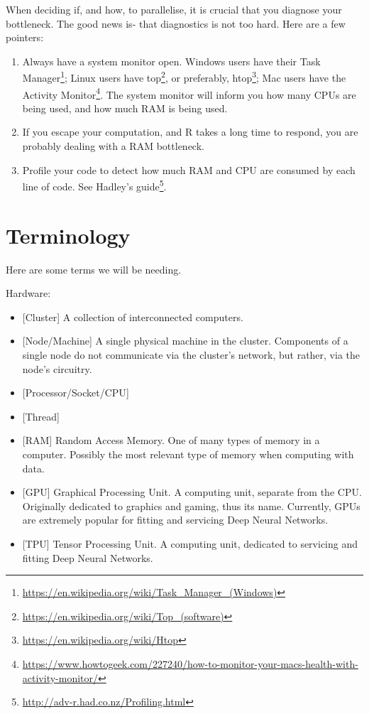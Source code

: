 \documentclass[]{book}
\providecommand{\tightlist}{%
  \setlength{\itemsep}{0pt}\setlength{\parskip}{0pt}}
\renewcommand{\href}[2]{#2\footnote{\url{#1}}}
\theoremstyle{definition}
\theoremstyle{definition}
\theoremstyle{definition}
\theoremstyle{remark}
\begin{document}
When deciding if, and how, to parallelise, it is crucial that you diagnose your bottleneck.
The good news is- that diagnostics is not too hard.
Here are a few pointers:

\begin{enumerate}
\def\labelenumi{\arabic{enumi}.}
\item
  Always have a system monitor open. Windows users have their \href{https://en.wikipedia.org/wiki/Task_Manager_(Windows)}{Task Manager}; Linux users have \href{https://en.wikipedia.org/wiki/Top_(software)}{top}, or preferably, \href{https://en.wikipedia.org/wiki/Htop}{htop}; Mac users have the \href{https://www.howtogeek.com/227240/how-to-monitor-your-macs-health-with-activity-monitor/}{Activity Monitor}. The system monitor will inform you how many CPUs are being used, and how much RAM is being used.
\item
  If you escape your computation, and R takes a long time to respond, you are probably dealing with a RAM bottleneck.
\item
  Profile your code to detect how much RAM and CPU are consumed by each line of code. See Hadley's \href{http://adv-r.had.co.nz/Profiling.html}{guide}.
\end{enumerate}

\hypertarget{terminology}{%
\section{Terminology}\label{terminology}}

Here are some terms we will be needing.

Hardware:

\begin{itemize}
\tightlist
\item
  {[}Cluster{]} A collection of interconnected computers.
\item
  {[}Node/Machine{]} A single physical machine in the cluster. Components of a single node do not communicate via the cluster's network, but rather, via the node's circuitry.
\item
  {[}Processor/Socket/CPU{]}
\item
  {[}Thread{]}
\item
  {[}RAM{]} Random Access Memory. One of many types of memory in a computer. Possibly the most relevant type of memory when computing with data.
\item
  {[}GPU{]} Graphical Processing Unit. A computing unit, separate from the CPU. Originally dedicated to graphics and gaming, thus its name. Currently, GPUs are extremely popular for fitting and servicing Deep Neural Networks.
\item
  {[}TPU{]} Tensor Processing Unit. A computing unit, dedicated to servicing and fitting Deep Neural Networks.
\end{itemize}
\end{document}
